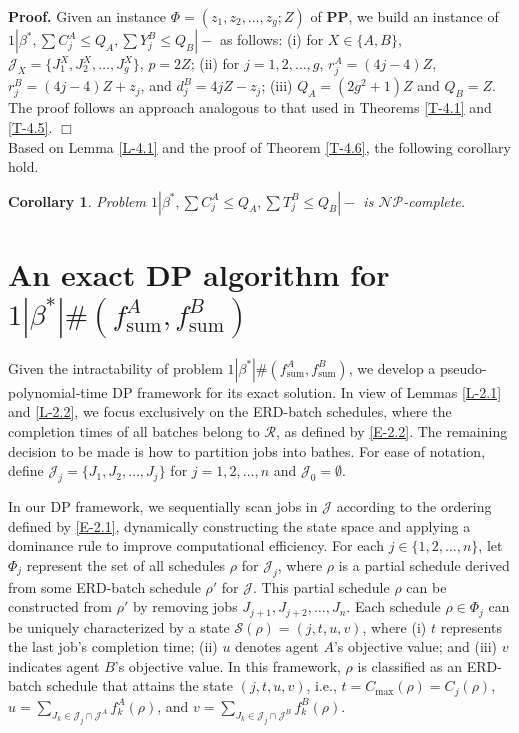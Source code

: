 \documentclass[12pt]{article}
\newtheorem{cor}{Corollary}[section]
\begin{document}
\begin{sloppypar}
\noindent \textbf{Proof.} Given an instance $\Phi=(z_1, z_2, \ldots, z_g; Z)$ of $\mathbf{PP}$, we build an instance of $1 | \beta^{*}, \sum C_j^A \leq Q_A, \sum Y_j^B \leq Q_B|-$ as follows: (i) for $X \in \{A, B\}$, $\mathcal{J}_X=\{J_1^X, J_2^X, \ldots, J_{g}^X\}$, $p=2Z$; (ii) for $j=1, 2, \ldots, g$, $r_j^A=(4j-4) Z$, $r_j^B=(4j-4) Z+z_j$, and $d_j^B=4jZ-z_j$; (iii) $Q_A=(2g^2+1)Z$ and $Q_B=Z$. The proof follows an approach analogous to that used in Theorems \ref{T-4.1} and \ref{T-4.5}. \hfill$\Box$\\

Based on Lemma \ref{L-4.1} and the proof of Theorem \ref{T-4.6}, the following corollary hold.

\begin{cor} \label{C-4.6.1}
Problem $1 | \beta^{*}, \sum C_j^A \leq Q_A, \sum T_j^B \leq Q_B|-$ is $\mathcal{NP}$-complete.
\end{cor}


\section{An exact DP algorithm for $1 | \beta^{*}|\#(f_{\mathrm{sum}}^A, f_{\mathrm{sum}}^B)$}

Given the intractability of problem $1 | \beta^{*}|\#(f_{\mathrm{sum}}^A, f_{\mathrm{sum}}^B)$, we develop a pseudo-polynomial-time DP framework for its exact solution. In view of Lemmas \ref{L-2.1} and \ref{L-2.2}, we focus exclusively on the ERD-batch schedules, where the completion times of all batches belong to $\mathcal{R}$, as defined by \eqref{E-2.2}. The remaining decision to be made is how to partition jobs into bathes. For ease of notation, define $\mathcal{J}_j=\{J_1, J_2, \ldots, J_j\}$ for $j=1, 2, \ldots, n$ and $\mathcal{J}_0=\emptyset$.

In our DP framework, we sequentially scan jobs in $\mathcal{J}$ according to the ordering defined by \eqref{E-2.1}, dynamically constructing the state space and applying a dominance rule to improve computational efficiency. For each $j \in \{1, 2, \ldots, n\}$, let $\Phi_j$ represent the set of all schedules $\rho$ for $\mathcal{J}_j$, where $\rho$ is a partial schedule derived from some ERD-batch schedule $\rho'$ for $\mathcal{J}$. This partial schedule $\rho$ can be constructed from $\rho'$ by removing jobs $J_{j+1}, J_{j+2}, \ldots, J_n$. Each schedule $\rho \in \Phi_j$ can be uniquely characterized by a state $\mathcal{S}(\rho)=(j, t, u, v)$, where (i) $t$ represents the last job's completion time; (ii) $u$ denotes agent $A$'s objective value; and (iii) $v$ indicates agent $B$'s objective value. In this framework, $\rho$ is classified as an ERD-batch schedule that attains the state $(j, t, u, v)$, i.e., $t=C_{\max}(\rho)=C_j(\rho)$, $u=\sum_{J_k \in \mathcal{J}_j \cap \mathcal{J}^{A}} f_k^A(\rho)$, and $v=\sum_{J_k \in \mathcal{J}_j \cap \mathcal{J}^{B}} f_k^B(\rho)$. 


\end{sloppypar}
\end{document}
